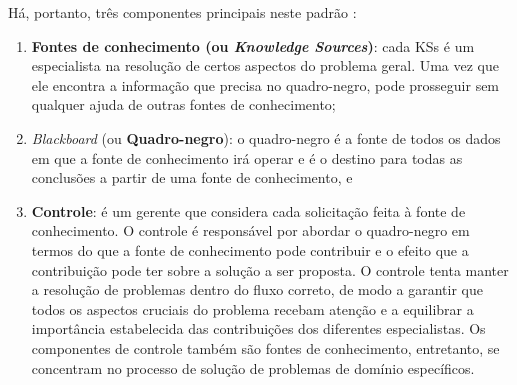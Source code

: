 \begin{description}


Há, portanto, três componentes principais neste padrão \cite{dong2005event}: 

\begin{enumerate}
    \item \textbf{Fontes de conhecimento (ou \textit{Knowledge Sources})}: cada KSs é um especialista na resolução de certos aspectos do problema geral. Uma vez que ele encontra a informação que precisa no quadro-negro, pode prosseguir sem qualquer ajuda de outras fontes de conhecimento; 
    \item \textit{Blackboard} (ou \textbf{Quadro-negro}): o quadro-negro é a fonte de todos os dados em que a fonte de conhecimento irá operar e é o destino para todas as conclusões a partir de uma fonte de conhecimento, e %
    \item \textbf{Controle}: é um gerente que considera cada solicitação feita à fonte de conhecimento. O controle é responsável por abordar o quadro-negro em termos do que a fonte de conhecimento pode contribuir e o efeito que a contribuição pode ter sobre a solução a ser proposta. O controle tenta manter a resolução de problemas dentro do fluxo correto, de modo a garantir que todos os aspectos cruciais do problema recebam atenção e a equilibrar a importância estabelecida das contribuições dos diferentes especialistas. Os componentes de controle também são fontes de conhecimento, entretanto, se concentram no processo de solução de problemas de domínio específicos. %
\end{enumerate}


\end{description}
